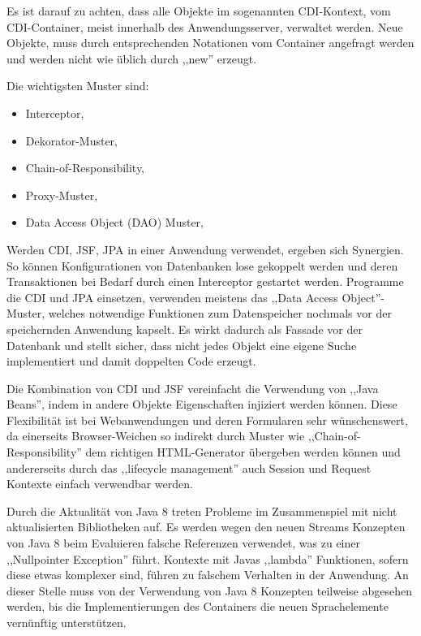 \documentclass[oneside, ngerman, toc=bibliography,bibliography=totoc,listof=entryprefix, open=right,numbers=noenddot,fontsize=12pt]{scrbook}
\begin{document}
Es ist darauf zu achten, dass alle Objekte im sogenannten {CDI-Kontext}, vom CDI-Container, meist innerhalb des Anwendungsserver, verwaltet werden. Neue Objekte, muss durch entsprechenden Notationen vom Container angefragt werden und werden nicht wie üblich durch ,,new'' erzeugt.

\bigskip
Die wichtigsten Muster sind:

\begin{itemize}
    \item Interceptor, \cite{schmidt2002pattern}
    \item Dekorator-Muster, \cite{gamma2011entwurfsmuster}
    \item Chain-of-Responsibility, \cite{gamma2011entwurfsmuster}
    \item Proxy-Muster, \cite{gamma2011entwurfsmuster}
    \item Data Access Object (DAO) Muster, \cite{bien2003j2ee}
\end{itemize}

Werden {CDI}, {JSF}, {JPA} in einer Anwendung verwendet, ergeben sich Synergien. So können Konfigurationen von Datenbanken lose gekoppelt werden und deren Transaktionen bei Bedarf durch einen Interceptor gestartet werden. Programme die {CDI} und {JPA} einsetzen, verwenden meistens das ,,Data Access Object''-Muster, welches notwendige Funktionen zum Datenspeicher nochmals vor der speichernden Anwendung kapselt. Es wirkt dadurch als Fassade vor der Datenbank und stellt sicher, dass nicht jedes Objekt eine eigene Suche implementiert und damit doppelten Code erzeugt.

Die Kombination von {CDI} und {JSF} vereinfacht die Verwendung von ,,Java Beans'', indem in andere Objekte Eigenschaften injiziert werden können. Diese Flexibilität ist bei Webanwendungen und deren Formularen sehr wünschenswert, da einerseits Browser-Weichen so indirekt durch Muster wie  ,,Chain-of-Responsibility'' dem richtigen HTML-Generator übergeben werden können und andererseits durch das ,,lifecycle management'' auch Session und Request Kontexte einfach verwendbar werden. 

Durch die Aktualität von Java 8 treten Probleme im Zusammenspiel mit nicht aktualisierten Bibliotheken auf. Es werden wegen den neuen Streams Konzepten von Java 8 beim Evaluieren falsche Referenzen verwendet, was zu einer ,,Nullpointer Exception'' führt. Kontexte mit Javas ,,lambda'' Funktionen, sofern diese etwas komplexer sind, führen zu falschem Verhalten in der Anwendung.
An dieser Stelle muss von der Verwendung von Java 8 Konzepten teilweise abgesehen werden, bis die Implementierungen des Containers die neuen Sprachelemente vernünftig unterstützen.
\end{document}
